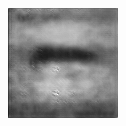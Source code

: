 \begin{figure}[H]
\begin{subfigure}[t]{0.13\textwidth}
  \end{subfigure}
  \begin{subfigure}[t]{0.13\textwidth}
    \centering
    \includegraphics[width=\linewidth]{img/one-trial/prediction_1_adversarial.png}
  \end{subfigure}
  \\
    \vspace{0.1cm}
  

\end{figure}
